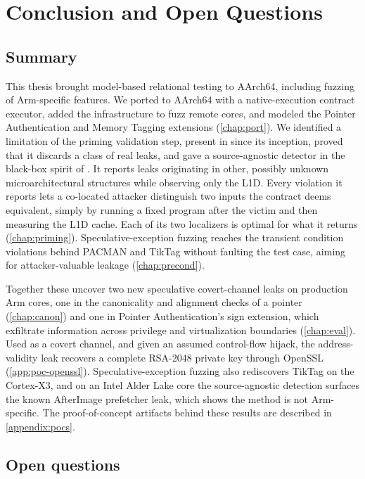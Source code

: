 \chapter{Conclusion and Open Questions}
\label{chap:conclusion}

\section{Summary}
\label{sec:concl-summary}

This thesis brought model-based relational testing to AArch64, including fuzzing of Arm-specific
features. We ported \revizor{} to AArch64 with a native-execution contract executor, added the infrastructure to
fuzz remote cores, and modeled the Pointer Authentication and Memory Tagging extensions
(\autoref{chap:port}). We identified a limitation of the priming validation step, present in
\revizor{} since its inception, proved that it discards a class of real leaks, and gave a
source-agnostic detector in the black-box spirit of \revizor{}. It reports leaks originating in
other, possibly unknown microarchitectural structures while observing only the L1D. Every violation
it reports lets a co-located attacker distinguish two inputs the contract deems equivalent, simply by
running a fixed program after the victim and then measuring the L1D cache. Each of its two
localizers is optimal for what it returns (\autoref{chap:priming}). Speculative-exception fuzzing reaches the transient condition
violations behind PACMAN and TikTag without faulting the test case, aiming for attacker-valuable
leakage (\autoref{chap:precond}).

Together these uncover two new speculative covert-channel leaks on production Arm cores, one in the
canonicality and alignment checks of a pointer (\autoref{chap:canon}) and one in Pointer Authentication's sign
extension, which exfiltrate information across privilege and virtualization boundaries
(\autoref{chap:eval}). Used as a covert channel, and given an assumed control-flow hijack, the address-validity leak
recovers a complete RSA-2048 private key through OpenSSL (\autoref{app:poc-openssl}). Speculative-exception fuzzing also rediscovers TikTag on the
Cortex-X3, and on an Intel Alder Lake core the source-agnostic detection surfaces the known
AfterImage prefetcher leak, which shows the method is not Arm-specific. The proof-of-concept
artifacts behind these results are described in \autoref{appendix:pocs}.

\section{Open questions}
\label{sec:concl-open}

